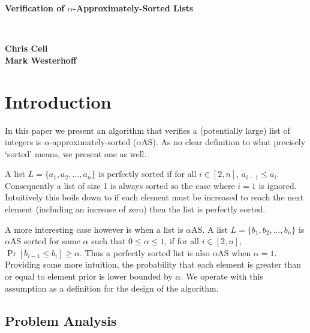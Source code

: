 \documentclass[11pt]{article}
\begin{document}
\begin{titlepage}
	\begin{center}
		\vspace*{1in}	
		\Huge
		\textbf{Verification of $\alpha$-Approximately-Sorted Lists}
		\vspace{.5in}
		
		\Large
		 \\
		
		\vspace{1.5in}
		
		\textbf{Chris Celi \\ Mark Westerhoff}
	\end{center}
\end{titlepage}

\clearpage

\tableofcontents

\clearpage

\section{Introduction}

In this paper we present an algorithm that verifies a (potentially large) list of integers is $\alpha$-approximately-sorted ($\alpha$AS). As no clear definition to what precisely `sorted' means, we present one as well. 

A list $L = \{a_1, a_2, ..., a_n\}$ is perfectly sorted if for all $i \in [2, n]$, $a_{i-1} \leq a_i$. Consequently a list of size 1 is always sorted so the case where $i = 1$ is ignored. Intuitively this boils down to if each element must be increased to reach the next element (including an increase of zero) then the list is perfectly sorted. 

A more interesting case however is when a list is $\alpha$AS. A list $L = \{b_1, b_2, ..., b_n\}$ is $\alpha$AS sorted for some $\alpha$ such that $0 \leq \alpha \leq 1$, if for all $i \in [2, n]$, $\Pr[b_{i-1} \leq b_i] \geq \alpha$. Thus a perfectly sorted list is also $\alpha$AS when $\alpha = 1$. Providing some more intuition, the probability that each element is greater than or equal to element prior is lower bounded by $\alpha$. We operate with this assumption as a definition for the design of the algorithm. 

\subsection{Problem Analysis}
\end{document}
